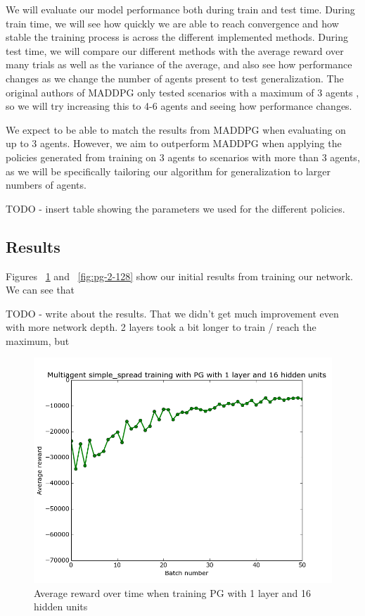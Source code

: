\documentclass{article}
\begin{document}
We will evaluate our model performance both during train and test time. During train time, we will see how quickly we are able to reach convergence and how stable the training process is across the different implemented methods. During test time, we will compare our different methods with the average reward over many trials as well as the variance of the average, and also see how performance changes as we change the number of agents present to test generalization. The original authors of MADDPG only tested scenarios with a maximum of 3 agents , so we will try increasing this to 4-6 agents and seeing how performance changes.

We expect to be able to match the results from MADDPG when evaluating on up to 3 agents. However, we aim to outperform MADDPG when applying the policies generated from training on 3 agents to scenarios with more than 3 agents, as we will be specifically tailoring our algorithm for generalization to larger numbers of agents.

TODO - insert table showing the parameters we used for the different policies.

\subsection{Results}

Figures ~\ref{fig:pg-1-16} and ~\ref{fig:pg-2-128} show our initial results from training our network. We can see that 

TODO - write about the results. That we didn't get much improvement even with more network depth. 2 layers took a bit longer to train / reach the maximum, but 

\begin{figure}
\begin{center}
    \includegraphics[scale=0.25]{pg-1-16-gamma1}
    \caption{Average reward over time when training PG with 1 layer and 16 hidden units}
\end{center}
\label{fig:pg-1-16}
\end{figure}
\end{document}
